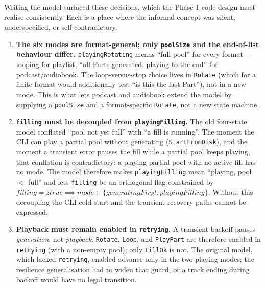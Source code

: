 \documentclass[a4paper,10pt,fleqn]{article}
\begin{document}
Writing the model surfaced these decisions, which the Phase-1 code design must
realise consistently. Each is a place where the informal concept was silent,
underspecified, or self-contradictory.

\begin{enumerate}
  \item \textbf{The six modes are format-general; only \texttt{poolSize} and
    the end-of-list behaviour differ.} \texttt{playingRotating} means ``full
    pool'' for every format --- looping for playlist, ``all Parts generated,
    playing to the end'' for podcast/audiobook. The loop-versus-stop choice
    lives in \texttt{Rotate} (which for a finite format would additionally test
    ``is this the last Part''), not in a new mode. This is what lets podcast and
    audiobook extend the model by supplying a \texttt{poolSize} and a
    format-specific \texttt{Rotate}, not a new state machine.

  \item \textbf{\texttt{filling} must be decoupled from \texttt{playingFilling}.}
    The old four-state model conflated ``pool not yet full'' with ``a fill is
    running''. The moment the CLI can play a partial pool without generating
    (\texttt{StartFromDisk}), and the moment a transient error pauses the fill
    while a partial pool keeps playing, that conflation is contradictory: a
    playing partial pool with no active fill has no mode. The model therefore
    makes \texttt{playingFilling} mean ``playing, pool $<$ full'' and lets
    \texttt{filling} be an orthogonal flag constrained by
    $filling = ztrue \implies mode \in \{generatingFirst, playingFilling\}$.
    Without this decoupling the CLI cold-start and the transient-recovery paths
    cannot be expressed.

  \item \textbf{Playback must remain enabled in \texttt{retrying}.} A transient
    backoff pauses \emph{generation}, not \emph{playback}. \texttt{Rotate},
    \texttt{Loop}, and \texttt{PlayPart} are therefore enabled in
    \texttt{retrying} (with a non-empty pool); only \texttt{FillOk} is not.
    The original model, which lacked \texttt{retrying}, enabled advance only in
    the two playing modes; the resilience generalisation had to widen that
    guard, or a track ending during backoff would have no legal transition.


\end{enumerate}
\end{document}
